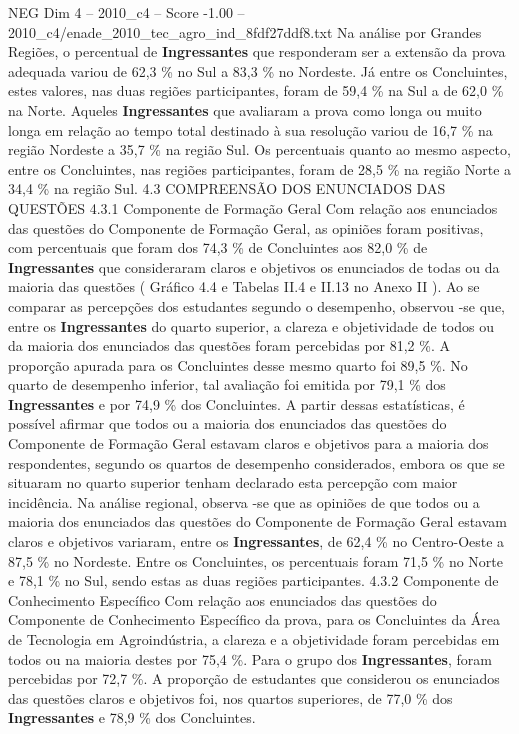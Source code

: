 \begin{textsample}{NEG Dim 4 – 2010\_c4 – Score -1.00 – 2010\_c4/enade\_2010\_tec\_agro\_ind\_8fdf27ddf8.txt}
Na análise por Grandes Regiões, o percentual de \textbf{Ingressantes} que responderam ser a extensão da prova adequada variou de 62,3 \% no Sul a 83,3 \% no Nordeste.
Já entre os Concluintes, estes valores, nas duas regiões participantes, foram de 59,4 \% na Sul a de 62,0 \% na Norte.
Aqueles \textbf{Ingressantes} que avaliaram a prova como longa ou muito longa em relação ao tempo total destinado à sua resolução variou de 16,7 \% na região Nordeste a 35,7 \% na região Sul.
Os percentuais quanto ao mesmo aspecto, entre os Concluintes, nas regiões participantes, foram de 28,5 \% na região Norte a 34,4 \% na região Sul. 4.3 COMPREENSÃO DOS ENUNCIADOS DAS QUESTÕES 4.3.1 Componente de Formação Geral Com relação aos enunciados das questões do Componente de Formação Geral, as opiniões foram positivas, com percentuais que foram dos 74,3 \% de Concluintes aos 82,0 \% de \textbf{Ingressantes} que consideraram claros e objetivos os enunciados de todas ou da maioria das questões ( Gráfico 4.4 e Tabelas II.4 e II.13 no Anexo II ).
Ao se comparar as percepções dos estudantes segundo o desempenho, observou -se que, entre os \textbf{Ingressantes} do quarto superior, a clareza e objetividade de todos ou da maioria dos enunciados das questões foram percebidas por 81,2 \%.
A proporção apurada para os Concluintes desse mesmo quarto foi 89,5 \%.
No quarto de desempenho inferior, tal avaliação foi emitida por 79,1 \% dos \textbf{Ingressantes} e por 74,9 \% dos Concluintes.
A partir dessas estatísticas, é possível afirmar que todos ou a maioria dos enunciados das questões do Componente de Formação Geral estavam claros e objetivos para a maioria dos respondentes, segundo os quartos de desempenho considerados, embora os que se situaram no quarto superior tenham declarado esta percepção com maior incidência.
Na análise regional, observa -se que as opiniões de que todos ou a maioria dos enunciados das questões do Componente de Formação Geral estavam claros e objetivos variaram, entre os \textbf{Ingressantes}, de 62,4 \% no Centro-Oeste a 87,5 \% no Nordeste.
Entre os Concluintes, os percentuais foram 71,5 \% no Norte e 78,1 \% no Sul, sendo estas as duas regiões participantes. 4.3.2 Componente de Conhecimento Específico Com relação aos enunciados das questões do Componente de Conhecimento Específico da prova, para os Concluintes da Área de Tecnologia em Agroindústria, a clareza e a objetividade foram percebidas em todos ou na maioria destes por 75,4 \%.
Para o grupo dos \textbf{Ingressantes}, foram percebidas por 72,7 \%.
A proporção de estudantes que considerou os enunciados das questões claros e objetivos foi, nos quartos superiores, de 77,0 \% dos \textbf{Ingressantes} e 78,9 \% dos Concluintes.

\end{textsample}
